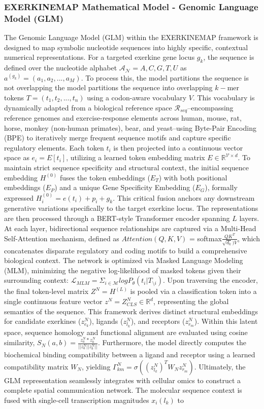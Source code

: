 \documentclass[11pt]{article}
\begin{document}
\subsubsection{EXERKINEMAP Mathematical Model - Genomic Language Model (GLM)}
The Genomic Language Model (GLM) within the EXERKINEMAP framework is designed to map symbolic nucleotide sequences into highly specific, contextual numerical representations. For a targeted exerkine gene locus $g_k$, the sequence is defined over the nucleotide alphabet $\mathcal{A_N}={A,C,G,T,U}$ as $a^{(g_k)} = (a_1, a_2,...,a_M)$. To process this, the model partitions the sequence is not overlapping the model partitions the sequence into overlapping $k-$mer tokens $T = (t_1,t_2,...,t_n)$ using a codon-aware vocabulary $V$. This vocabulary is dynamically adapted from a biological reference space $\mathcal{R}_{seq}$--encompassing reference genomes and exercise-response elements across human, mouse, rat, horse, monkey (non-human primates), bear, and yeast--using Byte-Pair Encoding (BPE) to iteratively merge frequent sequence motifs and capture specific regulatory elements. Each token $t_i$ is then projected into a continuous vector space as $e_i = E[t_i]$, utilizing a learned token embedding matrix $E \in \mathbb{R}^{\mathcal{V} \times d}$. To maintain strict sequence specificity and structural context, the initial sequence embedding $H^{(0)}$ fuses the token embeddings ($E_T$) with both positional embeddings ($E_P$) and a unique Gene Specificity Embedding ($E_G$), formally expressed $H_i^{(0)} = e(t_i) + p_i + g_k$. This critical fusion anchors any downstream generative variations specifically to the target exerkine locus. The representations are then processed through a BERT-style Transformer encoder spanning $L$ layers. At each layer, bidirectional sequence relationships are captured via a Multi-Head Self-Attention mechanism, defined as $Attention(Q,K,V)$ = softmax$\frac{QK^T}{\sqrt{d_k})V}$, which concatenates disparate regulatory and coding motifs to build a comprehensive biological context. The network is optimized via Masked Language Modeling (MLM), minimizing the negative log-likelihood of masked tokens given their surrounding context: $\mathcal{L}_{MLM} = \Sigma_{i\in\mathcal{M}} logP_{\theta}(t_i | T_{\setminus i})$. Upon traversing the encoder, the final token-level matrix $Z^N = H^{(L)}$ is pooled via a classification token into a single continuous feature vector $z^N = Z_{CLS}^N \in \mathbb{R}^d$, representing the global semantics of the sequence. This framework derives distinct structural embeddings for candidate exerkines ($z_{e_k}^N$), ligands ($z_{l_k}^N$), and receptors ($z_{r_m}^N$). Within this latent space, sequence homology and functional alignment are evaluated using cosine similarity, $S_N(a,b) = \frac{z_a^N*z_b^N}{||z_a^N || z_b^N ||}$. Furthermore, the model directly computes the biochemical binding compatibility between a ligand and receptor using a learned compatibility matrix $W_N$, yielding $\Gamma_{km}^N = \sigma((z_{l_k}^N)^TW_Nz_{r_m}^N)$. Ultimately, the GLM representation seamlessly integrates with cellular omics to construct a complete spatial communication network. The molecular sequence context is fused with single-cell transcription magnitudes $x_i(l_k)$ to 
\end{document}
